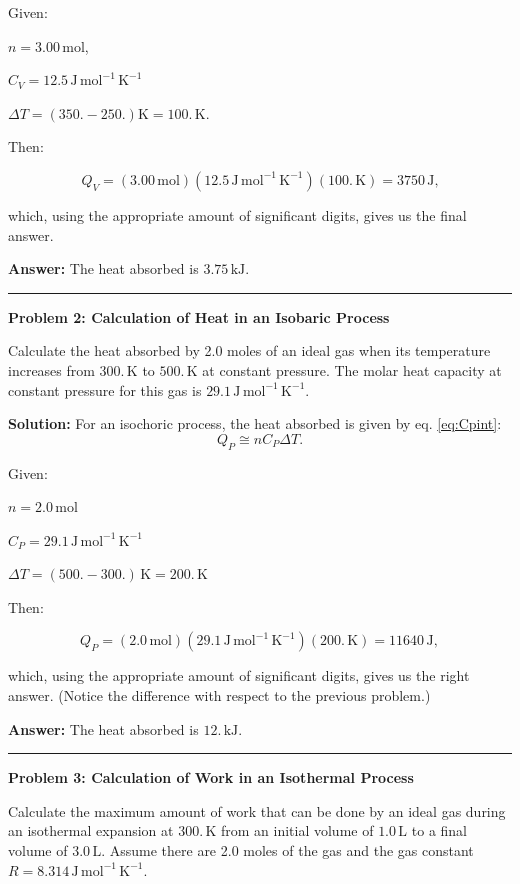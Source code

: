 \documentclass[
  9pt,
]{extbook}
\theoremstyle{definition}
\theoremstyle{definition}
\theoremstyle{definition}
\theoremstyle{definition}
\theoremstyle{remark}
\begin{document}
Given:

\(n=3.00 \, \text{mol}\),

\(C_V=12.5 \, \text{J} \, \text{mol}^{-1} \, \text{K}^{-1}\)

\(\Delta T = (350.-250.) \text{K}=100.\, \text{K}\).

Then:

\[Q_V=(3.00 \, \text{mol})(12.5\,\text{J} \, \text{mol}^{-1} \, \text{K}^{-1})(100.\,\text{K})=3750\,\text{J,}\]

which, using the appropriate amount of significant digits, gives us the final answer.

\textbf{Answer:} The heat absorbed is \(3.75\,\text{kJ}.\)

\begin{center}\rule{0.5\linewidth}{0.5pt}\end{center}

\textbf{Problem 2: Calculation of Heat in an Isobaric Process}

Calculate the heat absorbed by 2.0 moles of an ideal gas when its temperature increases from \(300. \,\text{K}\) to \(500. \,\text{K}\) at constant pressure. The molar heat capacity at constant pressure for this gas is \(29.1 \, \text{J} \, \text{mol}^{-1} \, \text{K}^{-1}\).

\textbf{Solution:} For an isochoric process, the heat absorbed is given by eq. \eqref{eq:Cpint}: \[Q_P \cong n C_P \Delta T.\]

Given:

\(n=2.0\,\text{mol}\)

\(C_P =29.1 \, \text{J} \, \text{mol}^{-1} \, \text{K}^{-1}\)

\(\Delta T= (500.-300.)\,\text{K}=200.\,\text{K}\)

Then:

\[Q_P=(2.0\,\text{mol})(29.1\,\text{J} \, \text{mol}^{-1} \, \text{K}^{-1})(200.\,\text{K}) = 11640\,\text{J},\]

which, using the appropriate amount of significant digits, gives us the right answer. (Notice the difference with respect to the previous problem.)

\textbf{Answer:} The heat absorbed is \(12.\, \text{kJ}.\)

\begin{center}\rule{0.5\linewidth}{0.5pt}\end{center}

\textbf{Problem 3: Calculation of Work in an Isothermal Process}

Calculate the maximum amount of work that can be done by an ideal gas during an isothermal expansion at \(300.\, \text{K}\) from an initial volume of \(1.0\,\text{L}\) to a final volume of \(3.0\,\text{L}\). Assume there are 2.0 moles of the gas and the gas constant \(R=8.314\, \text{J} \, \text{mol}^{-1} \, \text{K}^{-1}\).
\end{document}
